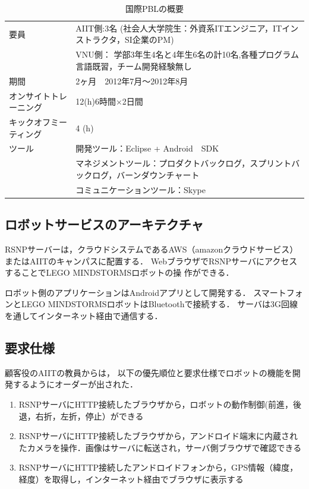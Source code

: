 \documentclass[a4j, 12Q, twocolumn, twoside]{jsarticle}
\begin{document}
\begin{table}[htb]
  \caption{国際PBLの概要}
  \begin{center}
   \small
    \begin{tabular}{|p{}|p{}|}
      \hline
      要員 & AIIT側:3名 (社会人大学院生：外資系ITエンジニア，ITインストラクタ，SI企業のPM) \\
       &VNU側： 学部3年生4名と4年生6名の計10名,各種プログラム言語既習，チーム開発経験無し \\      \hline
      期間 &2ヶ月　2012年7月～2012年8月 \\      \hline
       オンサイトトレーニング & 12(h)6時間×2日間\\      \hline
      キックオフミーティング &4 (h) \\      \hline
            ツール &開発ツール：Eclipse + Android　SDK\\
& マネジメントツール：プロダクトバックログ，スプリントバックログ，バーンダウンチャート\\
&コミュニケーションツール：Skype\\
      \hline
    \end{tabular}
  \end{center}
\end{table}


\subsection{ロボットサービスのアーキテクチャ}
RSNPサーバーは，クラウドシステムであるAWS（amazonクラウドサービス）またはAIITのキャンパスに配置する．
WebブラウザでRSNPサーバにアクセスすることでLEGO MINDSTORMSロボットの操
作ができる．

ロボット側のアプリケーションはAndroidアプリとして開発する．
スマートフォンとLEGO MINDSTORMSロボットはBluetoothで接続する．
サーバは3G回線を通してインターネット経由で通信する．

\subsection{要求仕様}
顧客役のAIITの教員からは，
以下の優先順位と要求仕様でロボットの機能を開発するようにオーダーが出された．
\begin{enumerate}
\item RSNPサーバにHTTP接続したブラウザから，ロボットの動作制御(前進，後退，右折，左折，停止）ができる
\item RSNPサーバにHTTP接続したブラウザから，アンドロイド端末に内蔵されたカメラを操作．画像はサーバに転送され，サーバ側ブラウザで確認できる
\item RSNPサーバにHTTP接続したアンドロイドフォンから，GPS情報（緯度，経度）を取得し，インターネット経由でブラウザに表示する
\end{enumerate}
\end{document}
